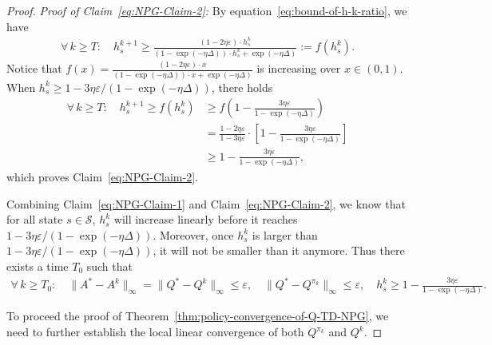 \documentclass[10pt,a4paper]{amsart}
\newcommand{\calS}{\mathcal{S}}
\newcommand{\ls}{\left}
\newcommand{\rs}{\right}
\begin{document}
\begin{proof}
    \textit{Proof of Claim~\ref{eq:NPG-Claim-2}:} By equation~\eqref{eq:bound-of-h-k-ratio}, we have
    \begin{align*}
        \forall\, k \geq T: \quad h_s^{k+1} \geq \frac{(1-2\eta\varepsilon) \cdot h^k_s}{(1-\exp(-\eta\Delta)) \cdot h_s^k  + \exp(-\eta\Delta)} := f(h_s^k).
    \end{align*}
    Notice that $f(x) = \frac{(1-2\eta\varepsilon) \cdot x}{(1-\exp(-\eta\Delta)) \cdot x + \exp(-\eta\Delta)}$ is increasing over $x\in(0,1)$. When $h_s^k \geq 1 - 3\eta\varepsilon / (1-\exp(-\eta\Delta))$, there holds
    \begin{align*}
        \forall\, k \geq T: \quad h_s^{k+1} \geq f(h_s^k) &\geq f\ls( 1 - \frac{3\eta\varepsilon}{1-\exp(-\eta\Delta)} \rs) \\
        &= \frac{1-2\eta\varepsilon}{1-3\eta\varepsilon} \cdot \ls[ 1 - \frac{3\eta\varepsilon}{1-\exp(-\eta\Delta)} \rs] \\
        &\geq 1 - \frac{3\eta\varepsilon}{1-\exp(-\eta\Delta)},
    \end{align*}
    which proves Claim~\ref{eq:NPG-Claim-2}.

    Combining Claim~\ref{eq:NPG-Claim-1} and Claim~\ref{eq:NPG-Claim-2}, we know that for all state $s\in\calS$, $h_s^k$ will increase linearly before it reaches $1-3\eta\varepsilon/(1-\exp(-\eta\Delta))$. Moreover, once $h_s^k$ is larger than $1 - 3\eta\varepsilon/(1-\exp(-\eta\Delta))$, it will not be smaller than it anymore. Thus there exists a time $T_0$ such that
    \begin{align*}
        \forall\, k \geq T_0 : \quad \| A^* - A^k \|_\infty = \| Q^* - Q^k \|_\infty \leq \varepsilon, \quad \| Q^* - Q^{\pi_k} \|_\infty \leq \varepsilon, \quad h_s^k \geq 1 - \frac{3\eta\varepsilon}{1-\exp(-\eta\Delta)}.
    \end{align*}

   To proceed the proof of Theorem~\ref{thm:policy-convergence-of-Q-TD-NPG}, we need to further establish the local linear convergence of both $Q^{\pi_k}$ and $Q^k$.


\end{proof}
\end{document}
